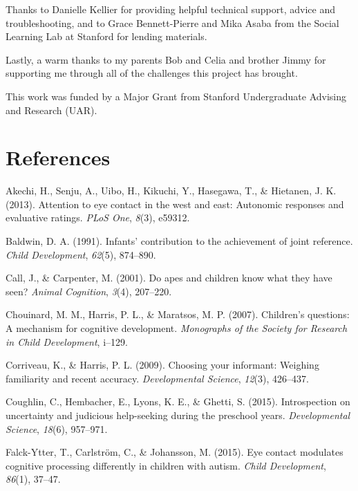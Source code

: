\documentclass[floatsintext,man]{apa6}
\theoremstyle{definition}
\theoremstyle{definition}
\theoremstyle{definition}
\theoremstyle{remark}
\begin{document}
Thanks to Danielle Kellier for providing helpful technical support,
advice and troubleshooting, and to Grace Bennett-Pierre and Mika Asaba
from the Social Learning Lab at Stanford for lending materials.

Lastly, a warm thanks to my parents Bob and Celia and brother Jimmy for
supporting me through all of the challenges this project has brought.

This work was funded by a Major Grant from Stanford Undergraduate
Advising and Research (UAR).

\newpage

\section{References}\label{references}

\setlength{\parindent}{-0.5in} \setlength{\leftskip}{0.5in}

\hypertarget{refs}{}
\hypertarget{ref-akechi2013attention}{}
Akechi, H., Senju, A., Uibo, H., Kikuchi, Y., Hasegawa, T., \& Hietanen,
J. K. (2013). Attention to eye contact in the west and east: Autonomic
responses and evaluative ratings. \emph{PLoS One}, \emph{8}(3), e59312.

\hypertarget{ref-baldwin1991infants}{}
Baldwin, D. A. (1991). Infants' contribution to the achievement of joint
reference. \emph{Child Development}, \emph{62}(5), 874--890.

\hypertarget{ref-call2001apes}{}
Call, J., \& Carpenter, M. (2001). Do apes and children know what they
have seen? \emph{Animal Cognition}, \emph{3}(4), 207--220.

\hypertarget{ref-chouinard2007children}{}
Chouinard, M. M., Harris, P. L., \& Maratsos, M. P. (2007). Children's
questions: A mechanism for cognitive development. \emph{Monographs of
the Society for Research in Child Development}, i--129.

\hypertarget{ref-corriveau2009choosing}{}
Corriveau, K., \& Harris, P. L. (2009). Choosing your informant:
Weighing familiarity and recent accuracy. \emph{Developmental Science},
\emph{12}(3), 426--437.

\hypertarget{ref-coughlin2015introspection}{}
Coughlin, C., Hembacher, E., Lyons, K. E., \& Ghetti, S. (2015).
Introspection on uncertainty and judicious help-seeking during the
preschool years. \emph{Developmental Science}, \emph{18}(6), 957--971.

\hypertarget{ref-falck2015eye}{}
Falck-Ytter, T., Carlström, C., \& Johansson, M. (2015). Eye contact
modulates cognitive processing differently in children with autism.
\emph{Child Development}, \emph{86}(1), 37--47.
\end{document}
